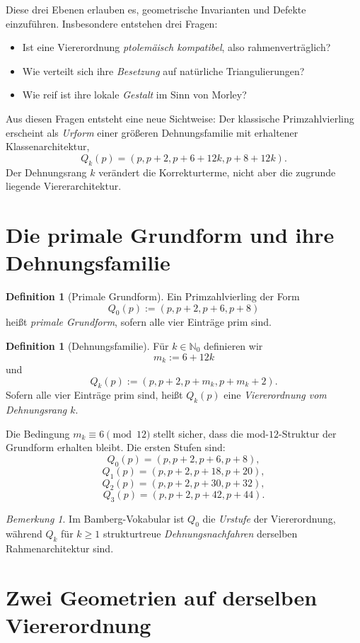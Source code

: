 \documentclass[11pt,a4paper]{article}
\theoremstyle{definition}
\newtheorem{definition}[satz]{Definition}
\theoremstyle{remark}
\newtheorem{bemerkung}[satz]{Bemerkung}
\newcommand{\N}{\mathbb{N}}
\begin{document}
Diese drei Ebenen erlauben es, geometrische Invarianten und Defekte einzuführen. Insbesondere entstehen drei Fragen:
\begin{itemize}
\item Ist eine Viererordnung \emph{ptolemäisch kompatibel}, also rahmenverträglich?
\item Wie verteilt sich ihre \emph{Besetzung} auf natürliche Triangulierungen?
\item Wie reif ist ihre lokale \emph{Gestalt} im Sinn von Morley?
\end{itemize}

Aus diesen Fragen entsteht eine neue Sichtweise: Der klassische Primzahlvierling erscheint als \emph{Urform} einer größeren Dehnungsfamilie mit erhaltener Klassenarchitektur,
\[
Q_k(p)=(p,p+2,p+6+12k,p+8+12k).
\]
Der Dehnungsrang $k$ verändert die Korrekturterme, nicht aber die zugrunde liegende Viererarchitektur.

\section{Die primale Grundform und ihre Dehnungsfamilie}

\begin{definition}[Primale Grundform]
Ein Primzahlvierling der Form
\[
Q_0(p):=(p,p+2,p+6,p+8)
\]
heißt \emph{primale Grundform}, sofern alle vier Einträge prim sind.
\end{definition}

\begin{definition}[Dehnungsfamilie]
Für $k\in\N_0$ definieren wir
\[
m_k:=6+12k
\]
und
\[
Q_k(p):=(p,p+2,p+m_k,p+m_k+2).
\]
Sofern alle vier Einträge prim sind, heißt $Q_k(p)$ eine \emph{Viererordnung vom Dehnungsrang $k$}.
\end{definition}

Die Bedingung $m_k\equiv 6\pmod{12}$ stellt sicher, dass die mod-$12$-Struktur der Grundform erhalten bleibt. Die ersten Stufen sind:
\[
Q_0(p)=(p,p+2,p+6,p+8),
\]
\[
Q_1(p)=(p,p+2,p+18,p+20),
\]
\[
Q_2(p)=(p,p+2,p+30,p+32),
\]
\[
Q_3(p)=(p,p+2,p+42,p+44).
\]

\begin{bemerkung}
Im Bamberg-Vokabular ist $Q_0$ die \emph{Urstufe} der Viererordnung, während $Q_k$ für $k\ge 1$ strukturtreue \emph{Dehnungsnachfahren} derselben Rahmenarchitektur sind.
\end{bemerkung}

\section{Zwei Geometrien auf derselben Viererordnung}
\end{document}

